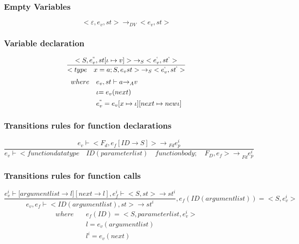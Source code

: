 \subsubsection{Empty Variables}
\begin{equation}
	<\varepsilon,{ e }_{ v },st>{ \rightarrow  }_{ DV }<{ e }_{ v },st>
\end{equation}

\subsubsection{Variable declaration}
\begin{equation}
	\frac { <S,{ e }_{ v }^{ `` },st[\iota \mapsto v]>{ \rightarrow  }_{ S }<{ e }_{ v }^{ ` },{ st }^{ ` }> }{ <type\quad x=a;S,{ e }_{ v }st>{ \rightarrow  }_{ S }<{ e }_{ v }^{ ` },{ st }^{ ` }> } 
\end{equation}
\begin{align*}
	where\quad &{ e }_{ v },st\vdash a{ \rightarrow  }_{ A }v \\
	&\iota {= e }_{ v }(next) \\
	&{ e }_{ v }^{ `` }={ e }_{ v }[x\mapsto \iota ][next\mapsto new \iota ]
\end{align*}

\subsubsection{Transitions rules for function declarations}
\begin{equation}
	\frac { { e }_{ v }\vdash { <F }_{ d },{ e }_{ f }[ID\rightarrow S]{ >\rightarrow  }_{ Fd }e_{ p }^{ i } }{ { e }_{ v }\vdash <{ functiondatatype\quad ID(parameterlist)\quad functionbody;\quad { F }_{ D },{ e }_{ f }>\rightarrow  }_{ Fd }e_{ p }^{ i } } 
\end{equation}

\subsubsection{Transitions rules for function calls}
\begin{equation}
	\frac { { e }_{ v }^{ i }\vdash [{ argumentlist\rightarrow l] }[next\rightarrow l],{ e }_{ f }^{ i }\vdash <S,st>\rightarrow { st }^{ i } }{ { e }_{ v },{ e }_{ f }\vdash <ID(argumentlist),st>\rightarrow { st }^{ i } } ,{ e }_{ f }(ID(argumentlist))=<S,{ e }_{ v }^{ i }>
\end{equation}
\begin{align*}
where\quad &{ e }_{ f }(ID)=<S,parameterlist,{ e }_{ v }^{ i }>
\\ &l={ e }_{ v }(argumentlist)
\\ &{ l }^{ i }={ e }_{ v }(next)
\end{align*}

